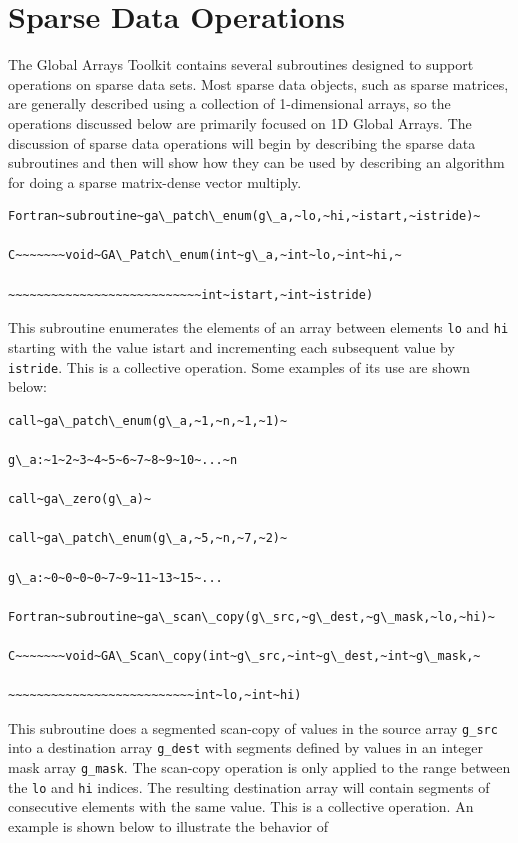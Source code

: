 \chapter{Sparse Data Operations}

The Global Arrays Toolkit contains several subroutines designed to
support operations on sparse data sets. Most sparse data objects,
such as sparse matrices, are generally described using a collection
of 1-dimensional arrays, so the operations discussed below are primarily
focused on 1D Global Arrays. The discussion of sparse data operations
will begin by describing the sparse data subroutines and then will
show how they can be used by describing an algorithm for doing a sparse
matrix-dense vector multiply.
\begin{verbatim}
Fortran~subroutine~ga\_patch\_enum(g\_a,~lo,~hi,~istart,~istride)~

C~~~~~~~void~GA\_Patch\_enum(int~g\_a,~int~lo,~int~hi,~

~~~~~~~~~~~~~~~~~~~~~~~~~~~int~istart,~int~istride)
\end{verbatim}
This subroutine enumerates the elements of an array between elements
\texttt{lo} and \texttt{hi} starting with the value istart and incrementing
each subsequent value by \texttt{istride}. This is a collective operation.
Some examples of its use are shown below:
\begin{verbatim}
call~ga\_patch\_enum(g\_a,~1,~n,~1,~1)~

g\_a:~1~2~3~4~5~6~7~8~9~10~...~n

call~ga\_zero(g\_a)~

call~ga\_patch\_enum(g\_a,~5,~n,~7,~2)~

g\_a:~0~0~0~0~7~9~11~13~15~...

Fortran~subroutine~ga\_scan\_copy(g\_src,~g\_dest,~g\_mask,~lo,~hi)~

C~~~~~~~void~GA\_Scan\_copy(int~g\_src,~int~g\_dest,~int~g\_mask,~

~~~~~~~~~~~~~~~~~~~~~~~~~~int~lo,~int~hi)
\end{verbatim}
This subroutine does a segmented scan-copy of values in the source
array \texttt{g\_src} into a destination array \texttt{g\_dest} with
segments defined by values in an integer mask array \texttt{g\_mask}.
The scan-copy operation is only applied to the range between the \texttt{lo}
and \texttt{hi} indices. The resulting destination array will contain
segments of consecutive elements with the same value. This is a collective
operation. An example is shown below to illustrate the behavior of
